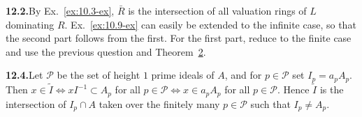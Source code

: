\noindent\textbf{12.2.}\quad By Ex.~\ref{ex:10.3-ex}, $\bar{R}$ is the intersection of all valuation rings of $L$ dominating $R$.
Ex.~\ref{ex:10.9-ex} can easily be extended to the infinite case, so that the second part
follows from the first. For the first part, reduce to the finite case and use the
previous question and Theorem~\hyperref[thm:12.2]{2}.

\noindent\textbf{12.4.}\quad Let $\mathcal{P}$ be the set of height $1$ prime ideals of $A$, and for $p \in \mathcal{P}$ set $I_p = a_pA_p$.
Then $x \in \tilde{I} \iff xI^{-1} \subset A_p$ for all $p \in \mathcal{P} \iff x \in a_pA_p$ for all $p \in \mathcal{P}$. Hence $\tilde{I}$ is the
intersection of $I_p \cap A$ taken over the finitely many $p \in \mathcal{P}$ such that $I_p \neq A_p$.

